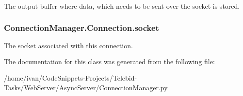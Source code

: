 The output buffer where data, which needs to be sent over the socket is stored. 

\hypertarget{class_connection_manager_1_1_connection_acf891c29169c0404caf1941086ed8ea5}{
\subsubsection[{socket}]{\setlength{\rightskip}{0pt plus 5cm}Connection\-Manager.\-Connection.\-socket}}\label{class_connection_manager_1_1_connection_acf891c29169c0404caf1941086ed8ea5}


The socket associated with this connection. 



The documentation for this class was generated from the following file\-:\begin{DoxyCompactItemize}
\item 
/home/ivan/\-Code\-Snippets-\/\-Projects/\-Telebid-\/\-Tasks/\-Web\-Server/\-Async\-Server/Connection\-Manager.\-py\end{DoxyCompactItemize}
